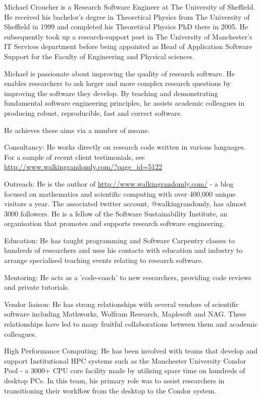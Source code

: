 \begin{participant}[type=R, PM=6, salary=7500]
Michael Croucher is a Research Software Engineer at The University of Sheffield. He received his bachelor's degree in Theoretical Physics from The University of Sheffield in 1999 and completed his Theoretical Physics PhD there in 2005. He subsequently took up a research-support post in The University of Manchester's IT Services department before being appointed as Head of Application Software Support for the Faculty of Engineering and Physical sciences.
 
Michael is passionate about improving the quality of research software. He enables researchers to ask larger and more complex research questions by improving the software they develop. By teaching and demonstrating fundamental software engineering principles, he assists academic colleagues in producing robust, reproducible, fast and correct software.
 
He achieves these aims via a number of means:
 
Consultancy: He works directly on research code written in various languages. For a sample of recent client testimonials, see \href{http://www.walkingrandomly.com/?page_id=5122}{http://www.walkingrandomly.com/?page\_id=5122}
 
Outreach: He is the author of \url{http://www.walkingrandomly.com/} - a blog focused on mathematics and scientific computing with over 400,000 unique visitors a year. The associated twitter account, @walkingrandomly, has almost 3000 followers.  He is a fellow of the Software Sustainability Institute, an organisation that promotes and supports research software engineering.
 
Education: He has taught programming and Software Carpentry classes to hundreds of researchers and uses his contacts with education and industry to arrange specialised teaching events relating to research software.
 
Mentoring: He acts as a 'code-coach' to new researchers, providing code reviews and private tutorials.
 
Vendor liaison: He has strong relationships with several vendors of scientific software including Mathworks, Wolfram Research, Maplesoft and NAG. These relationships have led to many fruitful collaborations between them and academic colleagues.
 
High Performance Computing: He has been involved with teams that develop and support Institutional HPC systems such as the Manchester University Condor Pool - a 3000+ CPU core facility made by utilising spare time on hundreds of desktop PCs. In this team, his primary role was to assist researchers in transitioning their workflow from the desktop to the Condor system.
\end{participant}
